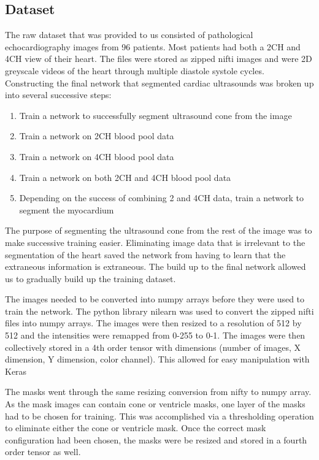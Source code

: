\documentclass[12pt]{article}
\begin{document}
\subsection{Dataset}
\par
The raw dataset that was provided to us consisted of pathological echocardiography images from 96 patients. 
Most patients had both a 2CH and 4CH view of their heart. The files were stored as zipped nifti images and were 2D greyscale videos of the heart through multiple diastole systole cycles.
Constructing the final network that segmented cardiac ultrasounds was broken up into several successive steps:

\begin{enumerate}
\item Train a network to successfully segment ultrasound cone from the image
\item Train a network on 2CH blood pool data
\item Train a network on 4CH blood pool data
\item Train a network on both 2CH and 4CH blood pool data
\item Depending on the success of combining 2 and 4CH data, train a network to segment the myocardium
\end{enumerate}

\par %
The purpose of segmenting the ultrasound cone from the rest of the image was to make successive training easier.
Eliminating image data that is irrelevant to the segmentation of the heart saved the network from having to learn that the extraneous information is extraneous. The build up to the final network allowed us to gradually build up the training dataset.
\par
The images needed to be converted into numpy arrays before they were used to train the network. The python library nilearn was used to convert the zipped nifti files into numpy arrays. The images were then resized to a resolution of 512 by 512 and the intensities were remapped from 0-255 to 0-1. The images were then collectively stored in a 4th order tensor with dimensions (number of images, X dimension, Y dimension, color channel). This allowed for easy manipulation with Keras
\par
The masks went through the same resizing conversion from nifty to numpy array. As the mask images can contain cone or ventricle masks, one layer of the masks had to be chosen for training. This was accomplished via a thresholding operation to eliminate either the cone or ventricle mask. Once the correct mask configuration had been chosen, the masks were be resized and stored in a fourth order tensor as well.
\end{document}
